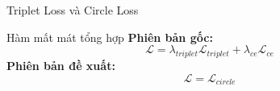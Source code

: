 \begin{frame}{Triplet Loss và Circle Loss}
    \begin{table}
        \centering
        \caption{So sánh Triplet Loss và Circle Loss.}
    \end{table}
\end{frame}
\begin{frame}{Hàm mất mát tổng hợp}
    \textbf{Phiên bản gốc:}
    \begin{equation}
        \mathcal{L} = \lambda_{triplet} \mathcal{L}_{triplet} + \lambda_{ce} \mathcal{L}_{ce}
    \end{equation}
    \textbf{Phiên bản đề xuất:}
    \begin{equation}
        \mathcal{L} = \mathcal{L}_{circle}
    \end{equation}
\end{frame}